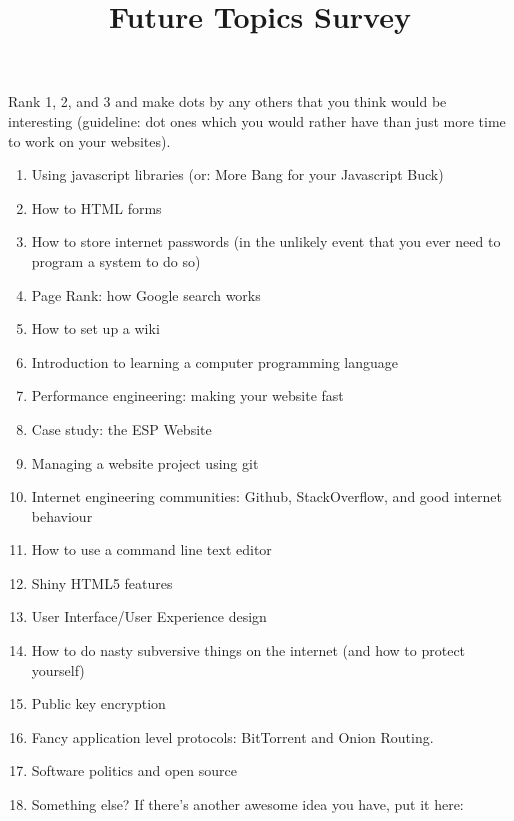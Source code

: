 \documentclass{article}
\title{Future Topics Survey}
\date{}
\begin{document}
\maketitle
\thispagestyle{empty}
Rank 1, 2, and 3 and make dots by any others that you think would be interesting (guideline:  dot ones which you would rather have than just more time to work on your websites).
\begin{enumerate}
\item Using javascript libraries (or: More Bang for your Javascript Buck)
\item How to HTML forms
\item How to store internet passwords (in the unlikely event that you ever need to program a system to do so)
\item Page Rank:  how Google search works 
\item How to set up a wiki 
\item Introduction to learning a computer programming language
\item Performance engineering:  making your website fast
\item Case study:  the ESP Website
\item Managing a website project using git 
\item Internet engineering communities: Github, StackOverflow, and good internet behaviour
\item How to use a command line text editor
\item Shiny HTML5 features
\item User Interface/User Experience design
\item How to do nasty subversive things on the internet (and how to protect yourself)
\item Public key encryption
\item Fancy application level protocols:  BitTorrent and Onion Routing.
\item Software politics and open source
\item Something else?  If there's another awesome idea you have, put it here:
\end{enumerate}
\end{document}
